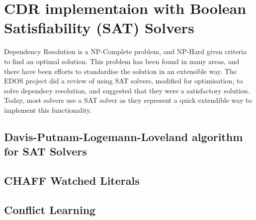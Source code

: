 \section{CDR implementaion with Boolean Satisfiability (SAT) Solvers}
\label{background.SAT}


Dependency Resolution is a NP-Complete problem, and NP-Hard given criteria to find an optimal solution.
This problem has been found in many areas, and there have been efforts to standardise the solution in an extensible way.
The EDOS project did a review of using SAT solvers, modified for optimisation, to solve dependecy resolution, and suggested that they were a satisfactory solution.
Today, most solvers use a SAT solver as they represent a quick extendible way to implement this functionality.




\subsection{Davis-Putnam-Logemann-Loveland algorithm for SAT Solvers}


\subsection{CHAFF Watched Literals}

\subsection{Conflict Learning}

